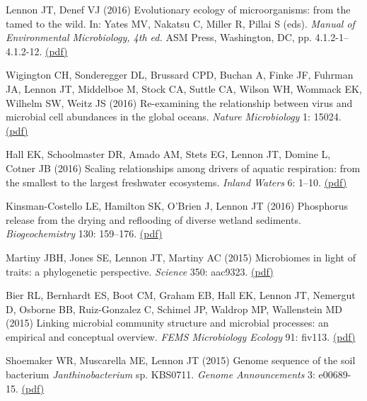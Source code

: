 \documentclass[11pt]{article}
\begin{document}
\begin{etaremune}
\item Lennon JT, Denef VJ (2016) Evolutionary ecology of microorganisms: from the tamed to the wild. In: Yates MV, Nakatsu C, Miller R, Pillai S (eds). \textit{Manual of Environmental Microbiology, 4th ed.} ASM Press, Washington, DC, pp. 4.1.2-1–4.1.2-12. \href{https://lennonlab.github.io/assets/publications/Lennon_Denef_2015.pdf}{(pdf)}

\item Wigington CH, Sonderegger DL, Brussard CPD, Buchan A, Finke JF, Fuhrman JA, Lennon JT, Middelboe M, Stock CA, Suttle CA, Wilson WH, Wommack EK, Wilhelm SW, Weitz JS (2016) Re-examining the relationship between virus and microbial cell abundances in the global oceans. \textit{Nature Microbiology} 1: 15024. \href{https://lennonlab.github.io/assets/publications/Wiggington_etal_2016.pdf}{(pdf)}

\item Hall EK, Schoolmaster DR, Amado AM, Stets EG, Lennon JT, Domine L, Cotner JB (2016) Scaling relationships among drivers of aquatic respiration: from the smallest to the largest freshwater ecosystems. \textit{Inland Waters} 6: 1–10. \href{https://lennonlab.github.io/assets/publications/Hall_etal_2016.pdf}{(pdf)}

\item Kinsman-Costello LE, Hamilton SK, O'Brien J, Lennon JT (2016) Phosphorus release from the drying and reflooding of diverse wetland sediments. \textit{Biogeochemistry} 130: 159–176. \href{https://lennonlab.github.io/assets/publications/Kinsman-Costello_etal_2016.pdf}{(pdf)}

\item Martiny JBH, Jones SE, Lennon JT, Martiny AC (2015) Microbiomes in light of traits: a phylogenetic perspective. \textit{Science} 350: aac9323. \href{https://lennonlab.github.io/assets/publications/Martiny_etal_2015.pdf}{(pdf)}

\item Bier RL, Bernhardt ES, Boot CM, Graham EB, Hall EK, Lennon JT, Nemergut D, Osborne BB, Ruiz-Gonzalez C, Schimel JP, Waldrop MP, Wallenstein MD (2015) Linking microbial community structure and microbial processes: an empirical and conceptual overview. \textit{FEMS Microbiology Ecology} 91: fiv113. \href{https://lennonlab.github.io/assets/publications/Bier_etal_2015.pdf}{(pdf)}

\item Shoemaker WR, Muscarella ME, Lennon JT (2015) Genome sequence of the soil bacterium \textit{Janthinobacterium} sp. KBS0711. \textit{Genome Announcements} 3: e00689-15. \href{https://lennonlab.github.io/assets/publications/Shoemaker_etal_2015.pdf}{(pdf)}


\end{etaremune}
\end{document}
